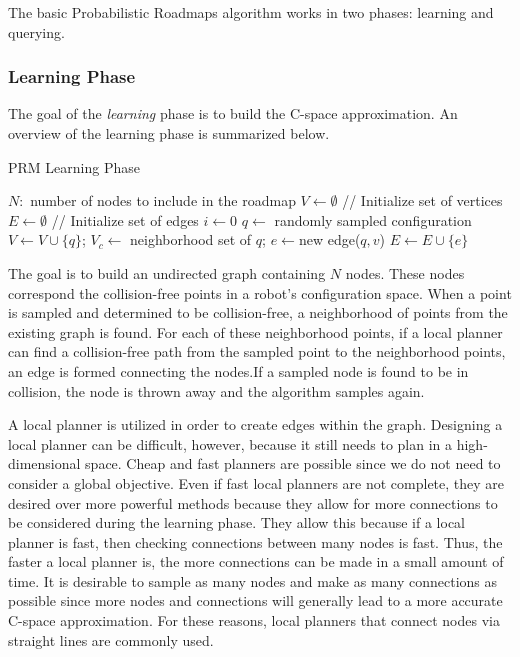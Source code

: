 \documentclass[10pt,conference]{ieeeconf}
\begin{document}
The basic Probabilistic Roadmaps algorithm \cite{PRM} works in two phases: learning and querying. 

\subsubsection{Learning Phase}

The goal of the \emph{learning} phase is to build the C-space approximation. An overview of the learning phase is summarized below.

\begin{algorithm}
\caption{PRM Learning Phase}
\begin{algorithmic}[1]
\State $N: $ number of nodes to include in the roadmap
\State $V \leftarrow \emptyset$ // Initialize set of vertices
\State $E \leftarrow \emptyset$ // Initialize set of edges
\State $i \leftarrow 0$
\State $q \leftarrow $ randomly sampled configuration
	\State $V \leftarrow V \cup \{q\}$;
	\State $V_c \leftarrow $ neighborhood set of $q$;
			\State $e \leftarrow $new edge($q,v$)
			\State $E \leftarrow E \cup \{e\}$
		\EndIf
	\EndFor
\EndIf
\EndWhile
\end{algorithmic}
\end{algorithm}

The goal is to build an undirected graph containing $N$ nodes. These nodes correspond the collision-free points in a robot's configuration space. When a point is sampled and determined to be collision-free, a neighborhood of points from the existing graph is found. For each of these neighborhood points, if a local planner can find a collision-free path from the sampled point to the neighborhood points, an edge is formed connecting the nodes.If a sampled node is found to be in collision, the node is thrown away and the algorithm samples again. 

A local planner is utilized in order to create edges within the graph. Designing a local planner can be difficult, however, because it still needs to plan in a high-dimensional space. Cheap and fast planners are possible since we do not need to consider a global objective. Even if fast local planners are not complete, they are desired over more powerful methods because they allow for more connections to be considered during the learning phase. They allow this because if a local planner is fast, then checking connections between many nodes is fast. Thus, the faster a local planner is, the more connections can be made in a small amount of time. It is desirable to sample as many nodes and make as many connections as possible since more nodes and connections will generally lead to a more accurate C-space approximation. For these reasons, local planners that connect nodes via straight lines are commonly used.
\end{document}
